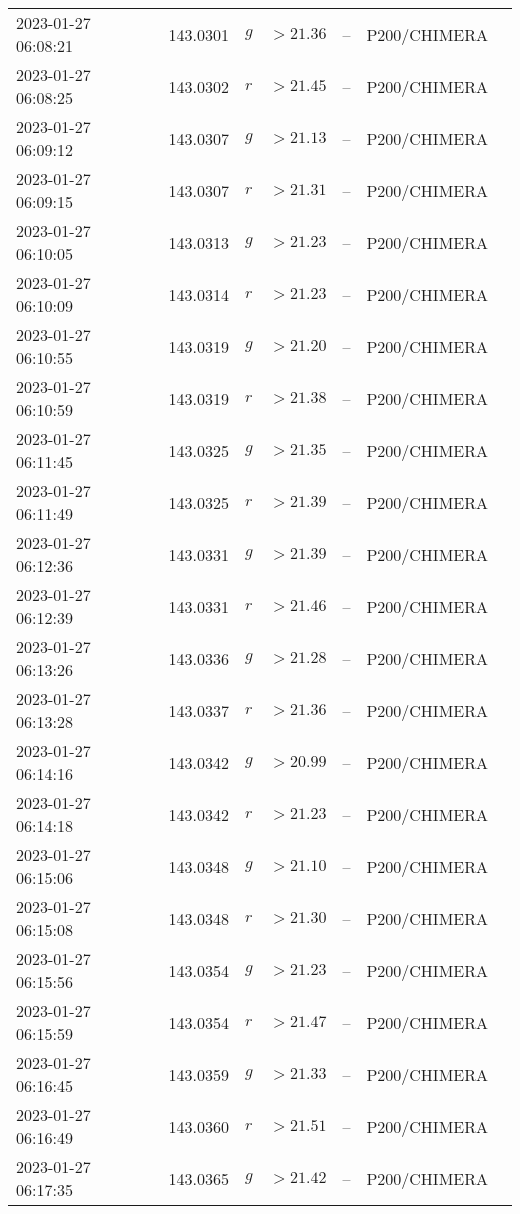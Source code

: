 \documentclass{nature_plusfigure}
\begin{document}
\begin{supplement}
\begin{center}
\begin{longtable}{lllllll}
2023-01-27 06:08:21 & 143.0301 & $g$ & $>21.36$ & -- & P200/CHIMERA &  \\ 
2023-01-27 06:08:25 & 143.0302 & $r$ & $>21.45$ & -- & P200/CHIMERA &  \\ 
2023-01-27 06:09:12 & 143.0307 & $g$ & $>21.13$ & -- & P200/CHIMERA &  \\ 
2023-01-27 06:09:15 & 143.0307 & $r$ & $>21.31$ & -- & P200/CHIMERA &  \\ 
2023-01-27 06:10:05 & 143.0313 & $g$ & $>21.23$ & -- & P200/CHIMERA &  \\ 
2023-01-27 06:10:09 & 143.0314 & $r$ & $>21.23$ & -- & P200/CHIMERA &  \\ 
2023-01-27 06:10:55 & 143.0319 & $g$ & $>21.20$ & -- & P200/CHIMERA &  \\ 
2023-01-27 06:10:59 & 143.0319 & $r$ & $>21.38$ & -- & P200/CHIMERA &  \\ 
2023-01-27 06:11:45 & 143.0325 & $g$ & $>21.35$ & -- & P200/CHIMERA &  \\ 
2023-01-27 06:11:49 & 143.0325 & $r$ & $>21.39$ & -- & P200/CHIMERA &  \\ 
2023-01-27 06:12:36 & 143.0331 & $g$ & $>21.39$ & -- & P200/CHIMERA &  \\ 
2023-01-27 06:12:39 & 143.0331 & $r$ & $>21.46$ & -- & P200/CHIMERA &  \\ 
2023-01-27 06:13:26 & 143.0336 & $g$ & $>21.28$ & -- & P200/CHIMERA &  \\ 
2023-01-27 06:13:28 & 143.0337 & $r$ & $>21.36$ & -- & P200/CHIMERA &  \\ 
2023-01-27 06:14:16 & 143.0342 & $g$ & $>20.99$ & -- & P200/CHIMERA &  \\ 
2023-01-27 06:14:18 & 143.0342 & $r$ & $>21.23$ & -- & P200/CHIMERA &  \\ 
2023-01-27 06:15:06 & 143.0348 & $g$ & $>21.10$ & -- & P200/CHIMERA &  \\ 
2023-01-27 06:15:08 & 143.0348 & $r$ & $>21.30$ & -- & P200/CHIMERA &  \\ 
2023-01-27 06:15:56 & 143.0354 & $g$ & $>21.23$ & -- & P200/CHIMERA &  \\ 
2023-01-27 06:15:59 & 143.0354 & $r$ & $>21.47$ & -- & P200/CHIMERA &  \\ 
2023-01-27 06:16:45 & 143.0359 & $g$ & $>21.33$ & -- & P200/CHIMERA &  \\ 
2023-01-27 06:16:49 & 143.0360 & $r$ & $>21.51$ & -- & P200/CHIMERA &  \\ 
2023-01-27 06:17:35 & 143.0365 & $g$ & $>21.42$ & -- & P200/CHIMERA &  \\ 

\end{longtable}
\end{center}
\end{supplement}
\end{document}
